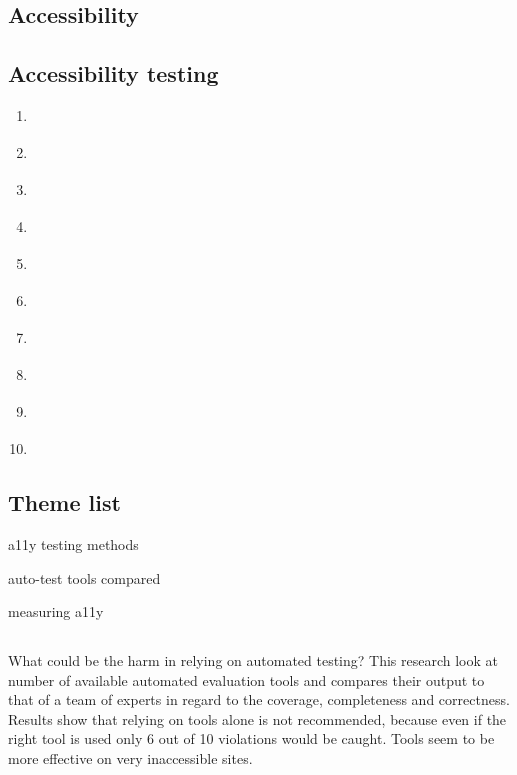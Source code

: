 \documentclass{master_thesis}
\begin{document}
\subsection*{Accessibility}
\subsection*{Accessibility testing}
\begin{enumerate}
	\item \cite{DequeSystems2021}
	\item \cite{AbouZahra2017}
	\item \cite{Sane2021}
	\item \cite{Thornton2022}
	\item \cite{RybinKoob2022}
	\item \cite{Ismailova2022}
	\item \cite{CampoverdeMolina2021}
	\item \cite{Kumar2020}
	\item \cite{Kumar2021}
	\item \cite{Seetha2022}
\end{enumerate}

\subsection*{Theme list}
\begin{list}{-}{}
	\item a11y testing methods
	\item auto-test tools compared
	\item measuring a11y
\end{list}

\subsection*{\citep{Vigo2013}}
What could be the harm in relying on automated testing? This research look at number of available automated evaluation tools and compares their output to that of a team of experts in regard to the coverage, completeness and correctness. Results show that relying on tools alone is not recommended, because even if the right tool is used only 6 out of 10 violations would be caught. Tools seem to be more effective on very inaccessible sites.

\printbibliography
\end{document}
